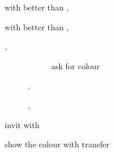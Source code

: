 \documentclass[../polish_club.tex]{subfiles}
\begin{document}

\begin{description}
    \item[] \PassOrCorrect{} with better \SpadeSymbol{} than \HeartSymbol, 
        \begin{description}
            \item[\PassBid] 
            \item[] 
        \end{description}
    \item[] \PassOrCorrect{} with better \HeartSymbol{} than \SpadeSymbol, 
        \begin{description}
            \item[\PassBid] 
            \item[] 
        \end{description}
    \item[] \Relay, 
        \begin{description}
            \item[] 
                \begin{description}
                    \item[] ask for colour
                        \begin{description}
                            \item[] 
                            \item[] 
                        \end{description}
                \end{description}
            \item[] , 
            \item[] , 
        \end{description}
    \item[]
    \item[] invit with 
    \item[] show the colour with transfer

\end{description}
\end{document}
